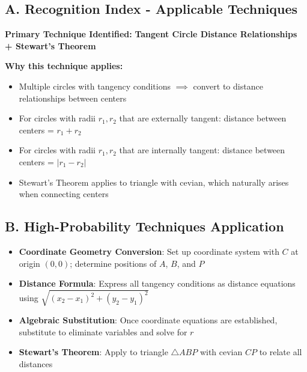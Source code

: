 \documentclass[]{article}
\begin{document}
\begin{techniquesbox}
\subsection*{A. Recognition Index - Applicable Techniques}

\textbf{Primary Technique Identified:} \textbf{Tangent Circle Distance Relationships + Stewart's Theorem}

\textbf{Why this technique applies:}
\begin{itemize}[leftmargin=*]
    \item Multiple circles with tangency conditions $\implies$ convert to distance relationships between centers
    \item For circles with radii $r_1, r_2$ that are externally tangent: distance between centers = $r_1 + r_2$
    \item For circles with radii $r_1, r_2$ that are internally tangent: distance between centers = $|r_1 - r_2|$
    \item Stewart's Theorem applies to triangle with cevian, which naturally arises when connecting centers
\end{itemize}

\subsection*{B. High-Probability Techniques Application}
\begin{itemize}[leftmargin=*]
    \item \textbf{Coordinate Geometry Conversion}: Set up coordinate system with $C$ at origin $(0,0)$; determine positions of $A$, $B$, and $P$
    \item \textbf{Distance Formula}: Express all tangency conditions as distance equations using $\sqrt{(x_2-x_1)^2 + (y_2-y_1)^2}$
    \item \textbf{Algebraic Substitution}: Once coordinate equations are established, substitute to eliminate variables and solve for $r$
    \item \textbf{Stewart's Theorem}: Apply to triangle $\triangle ABP$ with cevian $CP$ to relate all distances
\end{itemize}


\end{techniquesbox}
\end{document}
